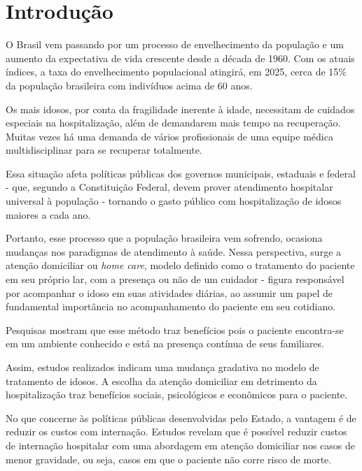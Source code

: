 \chapter{Introdução}\label{cap:introducao}

O Brasil vem passando por um processo de envelhecimento da população e
um aumento da expectativa de vida crescente desde a década de 1960. 
Com os atuais índices, a taxa do envelhecimento populacional atingirá, 
em 2025, cerca de 15\% da população brasileira com indivíduos acima 
de 60 anos. 

Os mais idosos, por conta da fragilidade inerente à idade, necessitam de 
cuidados especiais na hospitalização, além de demandarem mais tempo na 
recuperação. Muitas vezes há uma demanda de vários profissionais de uma equipe 
médica multidisciplinar para se recuperar totalmente.

Essa situação afeta políticas públicas dos governos municipais, estaduais e federal -
que, segundo a Constituição Federal, devem prover atendimento hospitalar
universal à população - tornando o gasto público com hospitalização de idosos
maiores a cada ano.

Portanto, esse processo que a população brasileira vem sofrendo, ocasiona mudanças 
nos paradigmas de atendimento à saúde. Nessa perspectiva, surge a atenção domiciliar
ou \textit{home care}, modelo definido como o tratamento do paciente 
em seu próprio lar, com a presença ou não de um cuidador - figura responsável
por acompanhar o idoso em suas atividades diárias, ao assumir um papel 
de fundamental importância no acompanhamento do paciente em seu cotidiano. 

Pesquisas mostram que esse método traz benefícios pois o 
paciente encontra-se em um ambiente conhecido e está na presença contínua de
seus familiares.

Assim, estudos realizados indicam uma mudança gradativa no modelo de
tratamento de idosos. A escolha da atenção domiciliar em detrimento da
hospitalização traz benefícios sociais, psicológicos e
econômicos para o paciente. %

No que concerne às políticas públicas desenvolvidas pelo Estado, 
a vantagem é de reduzir os custos com internação. Estudos revelam 
que é possível reduzir custos de internação hospitalar com uma 
abordagem em atenção domiciliar nos casos de menor gravidade, 
ou seja, casos em que o paciente não corre risco de morte. 

